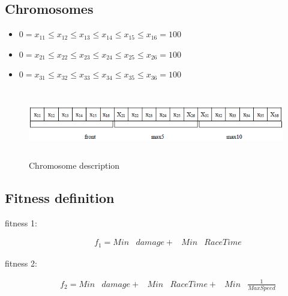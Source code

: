 \documentclass[runningheads,a4paper]{llncs}
\begin{document}
\subsection{Chromosomes}
\begin{itemize}
	\item []$0 = x_{11} \leq x_{12} \leq x_{13} \leq x_{14} \leq x_{15} \leq x_{16} = 100$
	\item []$0 = x_{21} \leq x_{22} \leq x_{23} \leq x_{24} \leq x_{25} \leq x_{26} = 100$
	\item []$0 = x_{31} \leq x_{32} \leq x_{33} \leq x_{34} \leq x_{35} \leq x_{36} = 100$
\end{itemize}
\begin{figure}[!h]	
	\begin{center}
		\includegraphics[width=13cm,height=3cm]{fig/cromosome}
		\caption{Chromosome description}
		\label{cromosome}	
	\end{center}	
\end{figure}
\subsection{Fitness definition}

\begin{description}
	\item[fitness 1:]  
	\begin{equation} \label{fit1}
	\begin{array}{lllll}
	f_{1} =  Min & damage + & Min & RaceTime 
	\end{array}
	\end{equation}
	\item[fitness 2:] 
	\begin{equation} \label{fit2}
	\begin{array}{llllll}
	f_{2}= Min & damage + & Min & RaceTime+ & Min & \frac{1}{MaxSpeed}
	\end{array}
	\end{equation}	
\end{description}
\end{document}
